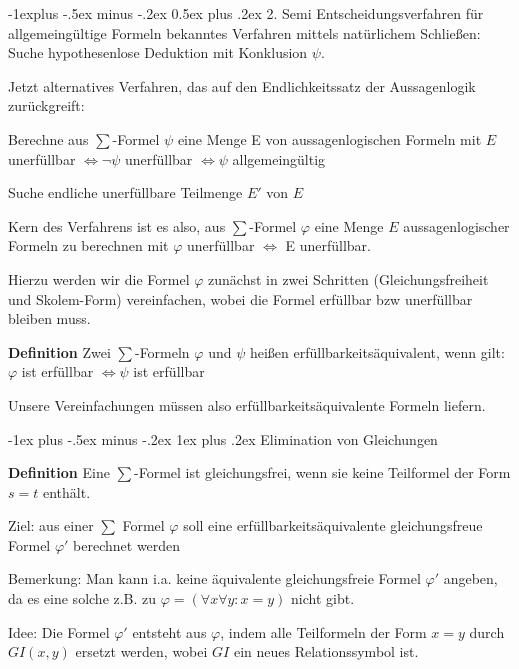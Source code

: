 \documentclass[a4paper]{article}
\makeatletter
\renewcommand{\note}[2]{\begin{noteBox} \textbf{#1} #2 \end{noteBox}}
\renewcommand{\subsection}{\@startsection{subsection}{2}{0mm}%
                {-1explus -.5ex minus -.2ex}%
                {0.5ex plus .2ex}%
                {\normalfont\normalsize\bfseries}}
\renewcommand{\subsubsection}{\@startsection{subsubsection}{3}{0mm}%
                {-1ex plus -.5ex minus -.2ex}%
                {1ex plus .2ex}%
                {\normalfont\small\bfseries}}
\makeatother
\begin{document}
\begin{multicols}{3}
  \subsection{2. Semi Entscheidungsverfahren für allgemeingültige Formeln}
  bekanntes Verfahren mittels natürlichem Schließen: Suche hypothesenlose Deduktion mit Konklusion $\psi$.

  Jetzt alternatives Verfahren, das auf den Endlichkeitssatz der Aussagenlogik zurückgreift:
  \begin{itemize*}
    \item Berechne aus $\sum$-Formel $\psi$ eine Menge E von aussagenlogischen Formeln mit $E$ unerfüllbar $\Leftrightarrow\lnot\psi$ unerfüllbar $\Leftrightarrow\psi$ allgemeingültig
    \item Suche endliche unerfüllbare Teilmenge $E'$ von $E$
  \end{itemize*}

  Kern des Verfahrens ist es also, aus $\sum$-Formel $\varphi$ eine Menge $E$ aussagenlogischer Formeln zu berechnen mit $\varphi$ unerfüllbar $\Leftrightarrow$ E unerfüllbar.

  Hierzu werden wir die Formel $\varphi$ zunächst in zwei Schritten (Gleichungsfreiheit und Skolem-Form) vereinfachen, wobei die Formel erfüllbar bzw unerfüllbar bleiben muss.

  \note{Definition}{Zwei $\sum$-Formeln $\varphi$ und $\psi$ heißen erfüllbarkeitsäquivalent, wenn gilt: $\varphi$ ist erfüllbar $\Leftrightarrow\psi$ ist erfüllbar}

  Unsere Vereinfachungen müssen also erfüllbarkeitsäquivalente Formeln liefern.

  \subsubsection{Elimination von Gleichungen}
  \note{Definition}{Eine $\sum$-Formel ist gleichungsfrei, wenn sie keine Teilformel der Form $s=t$ enthält. }

  Ziel: aus einer $\sum$ Formel $\varphi$ soll eine erfüllbarkeitsäquivalente gleichungsfreue Formel $\varphi'$ berechnet werden

  Bemerkung: Man kann i.a. keine äquivalente gleichungsfreie Formel $\varphi'$ angeben, da es eine solche z.B. zu $\varphi=(\forall x\forall y:x=y)$ nicht gibt.

  Idee: Die Formel $\varphi'$ entsteht aus $\varphi$, indem alle Teilformeln der Form $x=y$ durch $GI(x,y)$ ersetzt werden, wobei $GI$ ein neues Relationssymbol ist.


\end{multicols}
\end{document}
